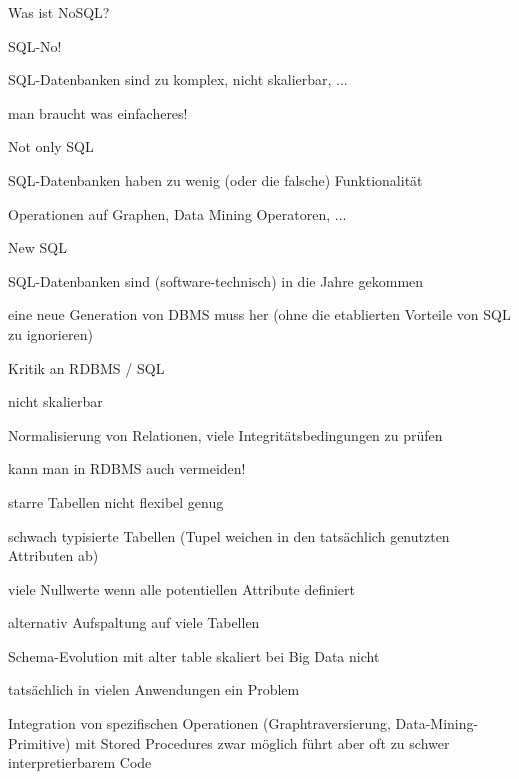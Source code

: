 \documentclass[a4paper]{article}
\begin{document}
\begin{multicols}{3}
\begin{itemize*}
    Was ist NoSQL?
    \begin{itemize*}
        \item SQL-No!
        \begin{itemize*}
            \item SQL-Datenbanken sind zu komplex, nicht skalierbar, ...
            \item man braucht was einfacheres!
        \end{itemize*}
        \item Not only SQL
        \begin{itemize*}
            \item SQL-Datenbanken haben zu wenig (oder die falsche) Funktionalität
            \item Operationen auf Graphen, Data Mining Operatoren, ...
        \end{itemize*}
        \item New SQL
        \begin{itemize*}
            \item SQL-Datenbanken sind (software-technisch) in die Jahre gekommen
            \item eine neue Generation von DBMS muss her (ohne die etablierten Vorteile von SQL zu ignorieren)
        \end{itemize*}
    \end{itemize*}

    Kritik an RDBMS / SQL
    \begin{itemize*}
        \item nicht skalierbar
        \begin{itemize*}
            \item Normalisierung von Relationen, viele Integritätsbedingungen zu prüfen
            \item kann man in RDBMS auch vermeiden!
        \end{itemize*}
        \item starre Tabellen nicht flexibel genug
        \begin{itemize*}
            \item schwach typisierte Tabellen (Tupel weichen in den tatsächlich genutzten Attributen ab)
            \item viele Nullwerte wenn alle potentiellen Attribute definiert
            \item alternativ Aufspaltung auf viele Tabellen
            \item Schema-Evolution mit alter table skaliert bei Big Data nicht
            \item tatsächlich in vielen Anwendungen ein Problem
        \end{itemize*}
        \item Integration von spezifischen Operationen (Graphtraversierung, Data-Mining-Primitive) mit Stored Procedures zwar möglich führt aber oft zu schwer interpretierbarem Code
    \end{itemize*}



\end{itemize*}
\end{multicols}
\end{document}
